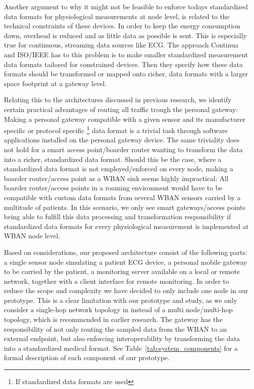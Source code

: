Another argument to why it might not be feasible to enforce todays standardized data formats for physiological measurements at node level, is related to the technical constraints of these devices. In order to keep the energy consumption down, overhead is reduced and as little data as possible is sent. This is especially true for continuous, streaming data sources like ECG. The approach Continua and ISO/IEEE has to this problem is to make smaller standardized measurement data formats tailored for constrained devices. Then they specify how these data formats should be transformed or mapped onto richer, data formats with a larger space footprint at a gateway level.

Relating this to the architectures discussed in previous research, we identify certain practical advantages of routing all traffic trough the personal gateway: Making a personal gateway compatible with a given sensor and its manufacturer specific or protocol specific \footnote{If standardized data formats are used} data format is a trivial task through software applications installed on the personal gateway device. The same triviality does not hold for a smart access point/boarder router wanting to transform the data into a richer, standardized data format. Should this be the case, where a standardized data format is not employed/enforced on every node, making a boarder router/access point as a WBAN sink seems highly impractical: All boarder router/access points in a roaming environment would have to be compatible with custom data formats from several WBAN sensors carried by a multitude of patients. In this scenario, we only see smart gateways/access points being able to fulfill this data processing and transformation responsibility if standardized data formats for every physiological measurement is implemented at WBAN node level.

Based on considerations, our proposed architecture consist of the following parts: a single sensor node simulating a patient ECG device, a personal mobile gateway to be carried by the patient, a monitoring server available on a local or remote network, together with a client interface for remote monitoring. In order to reduce the scope and complexity we have decided to only include one node in our prototype. This is a clear limitation with our prototype and study, as we only consider a single-hop network topology in instead of a multi node/multi-hop topology, which is recommended in earlier research. The gateway has the responsibility of not only routing the sampled data from the WBAN to an external endpoint, but also enforcing interoperability by transforming the data into a standardized medical format. See Table~\ref{tab:system_components} for a formal description of each component of our prototype.

